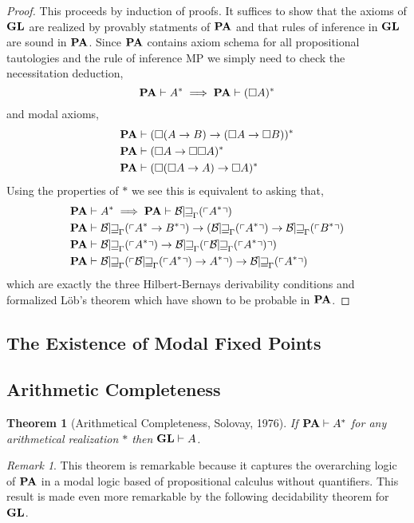 \documentclass[12pt, leqno]{article}
\newcommand{\proves}{\vdash}
\theoremstyle{theorem}
\newtheorem{theorem}{Theorem}[section]
\theoremstyle{definition}
\theoremstyle{definition}
\theoremstyle{remark}
\theoremstyle{definition}
\theoremstyle{remark}
\newtheorem{remark}{Remark}[subsection]
\begin{document}
\begin{proof}
This proceeds by induction of proofs. It suffices to show that the axioms of $\mathbf{GL}$ are realized by provably statments of $\mathbf{PA}$ and that rules of inference in $\mathbf{GL}$ are sound in $\mathbf{PA}$. Since $\mathbf{PA}$ contains axiom schema for all propositional tautologies and the rule of inference MP we simply need to check the necessitation deduction,
\[ \PA \proves A^* \implies \PA \proves (\square A)^* \]
and modal axioms,
\begin{align*}
\PA & \proves (\square (A \to B) \to (\square A \to \square B))^* 
\\
\PA & \proves (\square A \to \square \square A)^*
\\
\PA & \proves (\square (\square A \to A) \to \square A)^* 
\end{align*}
Using the properties of $*$ we see this is equivalent to asking that,
\begin{align*}
\PA & \proves A^* \implies \PA \proves \Thm{A^*}
\\
\PA & \proves \Thm{A^* \to B^*} \to (\Thm{A^*} \to \Thm{B^*}
\\
\PA & \proves \Thm{A^*} \to \Thm{\Thm{A^*}}
\\
\PA & \proves \Thm{\Thm{A^*} \to A^*} \to \Thm{A^*} 
\end{align*}
which are exactly the three Hilbert-Bernays derivability conditions and formalized L\"{o}b's theorem which have shown to be probable in $\mathbf{PA}$. 
\end{proof}

\subsection{The Existence of Modal Fixed Points}

\subsection{Arithmetic Completeness}

\begin{theorem}[Arithmetical Completeness, Solovay, 1976]
If $\PA \proves A^*$ for any arithmetical realization $*$ then $\GL \proves A$.
\end{theorem}


\begin{remark}
This theorem is remarkable because it captures the overarching logic of $\mathbf{PA}$ in a modal logic based of propositional calculus without quantifiers. This result is made even more remarkable by the following decidability theorem for $\mathbf{GL}$.
\end{remark}
\end{document}
